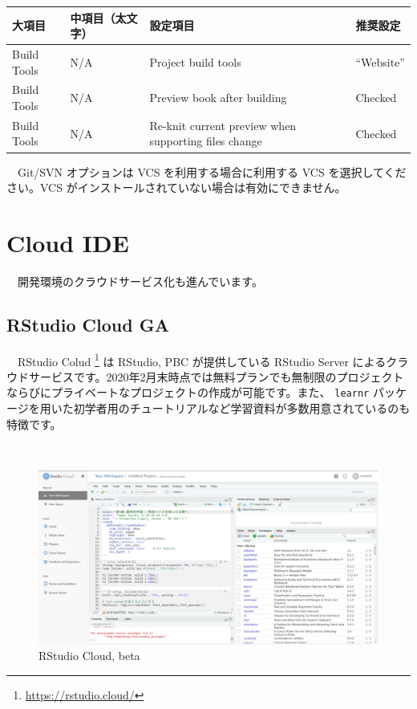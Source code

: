 \documentclass[
  12pt,
]{book}
\DeclareRobustCommand{\href}[2]{#2\footnote{\url{#1}}}
\begin{document}
\begin{longtable}[]{@{}
  >{\raggedright\arraybackslash}p{}
  >{\raggedright\arraybackslash}p{}
  >{\raggedright\arraybackslash}p{}
  >{\raggedright\arraybackslash}p{}@{}}
\toprule
大項目 & 中項目（太文字） & 設定項目 & 推奨設定 \\
\midrule
\endhead
Build Tools & N/A & Project build tools & ``Website'' \\
Build Tools & N/A & Preview book after building & Checked \\
Build Tools & N/A & Re-knit current preview when supporting files change & Checked \\
\bottomrule
\end{longtable}

　Git/SVN オプションは VCS を利用する場合に利用する VCS を選択してください。VCS がインストールされていない場合は有効にできません。

\hypertarget{cloud-ide}{%
\chapter{Cloud IDE}\label{cloud-ide}}

　開発環境のクラウドサービス化も進んでいます。

\hypertarget{rstudio-cloud-ga}{%
\section{RStudio Cloud GA}\label{rstudio-cloud-ga}}

　\href{https://rstudio.cloud/}{RStudio Colud } は RStudio, PBC が提供している RStudio Server によるクラウドサービスです。2020年2月末時点では無料プランでも無制限のプロジェクトならびにプライベートなプロジェクトの作成が可能です。また、 \texttt{learnr} パッケージを用いた初学者用のチュートリアルなど学習資料が多数用意されているのも特徴です。

　\\

\begin{figure}[H]

{\centering \includegraphics[width=0.8\linewidth,]{fig/RStudio/Cloud} 

}

\caption{RStudio Cloud, beta}\label{fig:unnamed-chunk-100}
\end{figure}
\end{document}
